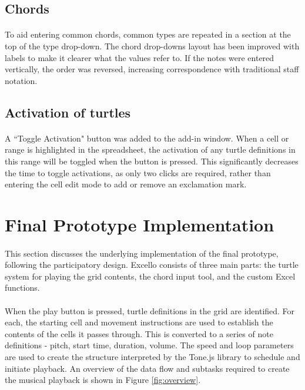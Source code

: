 \subsection{Chords}

\paragraph{} To aid entering common chords, common types are repeated in a section at the top of the type drop-down. The chord drop-downs layout has been improved with labels to make it clearer what the values refer to. If the notes were entered vertically, the order was reversed, increasing correspondence with traditional staff notation.

\subsection{Activation of turtles}

\paragraph{} A ``Toggle Activation" button was added to the add-in window. When a cell or range is highlighted in the spreadsheet, the activation of any turtle definitions in this range will be toggled when the button is pressed.  This significantly decreases the time to toggle activations, as only two clicks are required, rather than entering the cell edit mode to add or remove an exclamation mark.

\section{Final Prototype Implementation}

\paragraph{} This section discusses the underlying implementation of the final prototype, following the participatory design. Excello consists of three main parts: the turtle system for playing the grid contents, the chord input tool, and the custom Excel functions.

\paragraph{} When the play button is pressed, turtle definitions in the grid are identified. For each, the starting cell and movement instructions are used to establish the contents of the cells it passes through. This is converted to a series of note definitions - pitch, start time, duration, volume. The speed and loop parameters are used to create the structure interpreted by the Tone.js library to schedule and initiate playback. An overview of the data flow and subtasks required to create the musical playback is shown in Figure \ref{fig:overview}.

